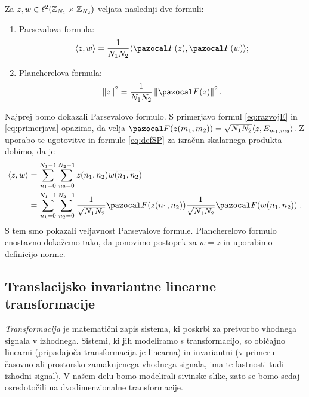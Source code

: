 %
\begin{izrek}
Za $z, w \in \ell^2(\mathbb Z_{N_1} \times \mathbb Z_{N_2})$ veljata naslednji dve formuli:
\begin{enumerate}
\item Parsevalova formula:
$$\langle z, w \rangle = \frac{1}{N_1 N_2} \langle \F(z), \F(w) \rangle;$$
\item Plancherelova formula:
$$\norm{z}^2 = \frac{1}{N_1 N_2} \norm{\F(z)}^2.$$
\end{enumerate}
\end{izrek}
%
\begin{dokaz} Najprej bomo dokazali Parsevalovo formulo. S primerjavo formul \eqref{eq:razvojE} in \eqref{eq:primerjava} opazimo, da velja $\F(z(m_1, m_2)) = \sqrt{N_1N_2} \langle z, E_{m_1, m_2}\rangle$. Z uporabo te ugotovitve in formule \eqref{eq:defSP} za izračun skalarnega produkta dobimo, da je
%
\begin{align*}
\langle z, w \rangle & = \sum_{n_1 = 0}^{N_1 - 1} \sum_{n_2 = 0}^{N_2 - 1} z(n_1, n_2)\overline{w(n_1, n_2)} \\
& = \sum_{n_1 = 0}^{N_1 - 1} \sum_{n_2 = 0}^{N_2 - 1} \frac{1}{\sqrt{N_1N_2}} \F(z(n_1, n_2)) \frac{1}{\sqrt{N_1N_2}} \F(w(n_1,n_2)) \;.
\end{align*}
% 
S tem smo pokazali veljavnost Parsevalove formule. Plancherelovo formulo enostavno dokažemo tako, da ponovimo postopek za $w = z$ in uporabimo definicijo norme.
\end{dokaz}
%
\subsection{Translacijsko invariantne linearne transformacije}
\emph{Transformacija} je matematični zapis sistema, ki poskrbi za pretvorbo vhodnega signala v izhodnega. Sistemi, ki jih modeliramo s transformacijo, so običajno linearni (pripadajoča transformacija je linearna) in invariantni (v primeru časovno ali prostorsko zamaknjenega vhodnega signala, ima te lastnosti tudi izhodni signal). V našem delu bomo modelirali sivinske slike, zato se bomo sedaj osredotočili na dvodimenzionalne transformacije.
 

